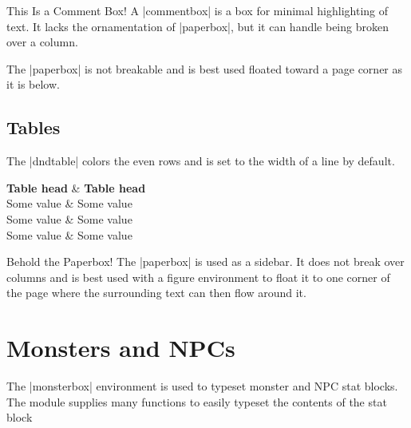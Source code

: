 \documentclass[letterpaper,twocolumn,openany]{dndbook}
\begin{document}
	\begin{commentbox}{This Is a Comment Box!}
		A |commentbox| is a box for minimal highlighting of text. It lacks the ornamentation of |paperbox|, but it can handle being broken over a column.
	\end{commentbox}
	
	The |paperbox| is not breakable and is best used floated toward a page corner as it is below.
	
	\section{Tables}
	The |dndtable| colors the even rows and is set to the width of a line by default.
	
	\begin{dndtable}
		\textbf{Table head}  & \textbf{Table head} \\
		Some value  & Some value \\
		Some value  & Some value \\
		Some value  & Some value
	\end{dndtable}
	
	\begin{paperbox}[float=!b]{Behold the Paperbox!}
		The |paperbox| is used as a sidebar. It does not break over columns and is best used with a figure environment to float it to one corner of the page where the surrounding text can then flow around it.
	\end{paperbox}
	
	\chapter{Monsters and NPCs}
	The |monsterbox| environment is used to typeset monster and NPC stat blocks. The module supplies many functions to easily typeset the contents of the stat block
	
\end{document}
